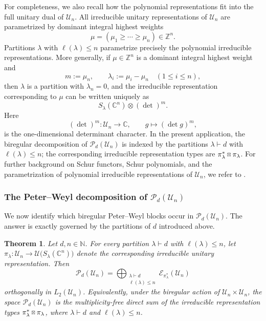 \documentclass[11pt,showkeys]{amsart}
\newcommand{\sboxtimes}
{\mathbin{\vcenter{\hbox{\scalebox{0.65}{$\boxtimes$}}}}}
\newtheorem{theorem}{Theorem}[section]
\begin{document}
For completeness, we also recall how the polynomial representations fit
into the full unitary dual of \(\mathcal U_n\). All irreducible unitary
representations of \(\mathcal U_n\) are parametrized by dominant integral
highest weights
\[
        \mu=(\mu_1\ge\cdots\ge\mu_n)\in\mathbb Z^n.
\]
Partitions \(\lambda\) with \(\ell(\lambda)\le n\) parametrize precisely
the polynomial irreducible representations. More generally, if
\(\mu\in\mathbb Z^n\) is a dominant integral highest weight and
\[
        m:=\mu_n,
        \qquad
        \lambda_i:=\mu_i-\mu_n
        \quad(1\le i\le n),
\]
then \(\lambda\) is a partition  with $\lambda_n=0$, and the irreducible representation
corresponding to \(\mu\) can be written uniquely as
\[
        S_\lambda(\mathbb C^n)\otimes(\det)^m.
\]
Here
\[
        (\det)^m:
        \mathcal U_n\longrightarrow\mathbb C,
        \qquad
        g\longmapsto(\det g)^m,
\]
is the one-dimensional determinant character. In the present
application, the biregular decomposition of
\(\mathcal P_d(\mathcal U_n)\) is indexed by the partitions
\(\lambda\vdash d\) with \(\ell(\lambda)\leq n\); the corresponding
irreducible representation types are
\(\pi_\lambda^*\sboxtimes\pi_\lambda\).
For further background on Schur functors, Schur polynomials, and the
parametrization of polynomial irreducible representations of
\(\mathcal U_n\), we refer to \cite{fulton2013representation}.


\subsubsection{The Peter--Weyl decomposition of \(\mathcal P_d(\mathcal U_n)\)}
\label{subsub:rep-identifications}

We now identify which biregular Peter--Weyl blocks occur in
\(\mathcal P_d(\mathcal U_n)\). The answer is exactly governed by the
partitions of \(d\) introduced above.



\begin{theorem}
\label{thm:unitary-pw-polynomials}
Let \(d,n\in\mathbb N\). For every partition
\(\lambda\vdash d\) with \(\ell(\lambda)\le n\), let
\(
    \pi_\lambda:
    \mathcal U_n
    \longrightarrow
    \mathcal U\bigl(S_\lambda(\mathbb C^n)\bigr)
\)
denote the corresponding irreducible unitary representation. Then
\[
    \mathcal P_d(\mathcal U_n)
    =
    \bigoplus_{\substack{\lambda\vdash d\\ \ell(\lambda)\le n}}
    \mathcal E_{\pi_\lambda^*}(\mathcal U_n)
\]
orthogonally in \(L_2(\mathcal U_n)\). Equivalently, under the
biregular action of
\(\mathcal U_n\times\mathcal U_n\), the space
\(\mathcal P_d(\mathcal U_n)\) is the multiplicity-free direct sum of
the irreducible representation types
\(
    \pi_\lambda^*\sboxtimes\pi_\lambda
    \), where 
    \(\lambda\vdash d\) and \(\ell(\lambda)\le n\).
\end{theorem}
\end{document}
